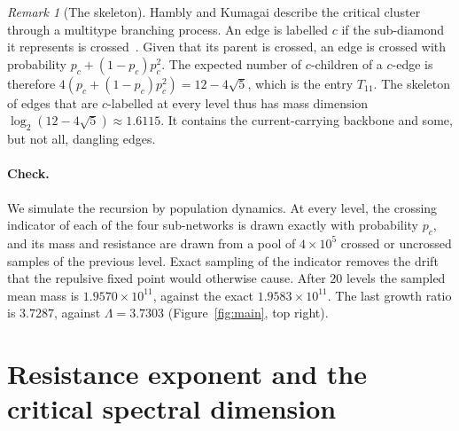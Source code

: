\documentclass[11pt]{article}
\theoremstyle{remark}\newtheorem*{remark}{Remark}
\begin{document}
\begin{remark}[The skeleton]
Hambly and Kumagai describe the critical cluster through a multitype branching process. An edge is labelled $c$ if the
sub-diamond it represents is crossed~\cite{HamblyKumagai}. Given that its parent is crossed, an edge is crossed with
probability $p_c+(1-p_c)p_c^2$. The expected number of $c$-children of a $c$-edge is therefore $4(p_c+(1-p_c)p_c^2)=12-4\sqrt5$,
which is the entry $T_{11}$. The skeleton of edges that are $c$-labelled at every level thus has mass dimension
$\log_2(12-4\sqrt5)\approx1.6115$. It contains the current-carrying backbone and some, but not all, dangling edges.
\end{remark}

\paragraph{Check.} We simulate the recursion by population dynamics. At every level, the crossing indicator of each of
the four sub-networks is drawn exactly with probability $p_c$, and its mass and resistance are drawn from a pool of
$4\times10^5$ crossed or uncrossed samples of the previous level. Exact sampling of the indicator removes the drift that
the repulsive fixed point would otherwise cause. After $20$ levels the sampled mean mass is $1.9570\times10^{11}$,
against the exact $1.9583\times10^{11}$. The last growth ratio is $3.7287$, against $\Lambda=3.7303$
(Figure~\ref{fig:main}, top right).

\section{Resistance exponent and the critical spectral dimension}
\label{sec:ds}
\end{document}
